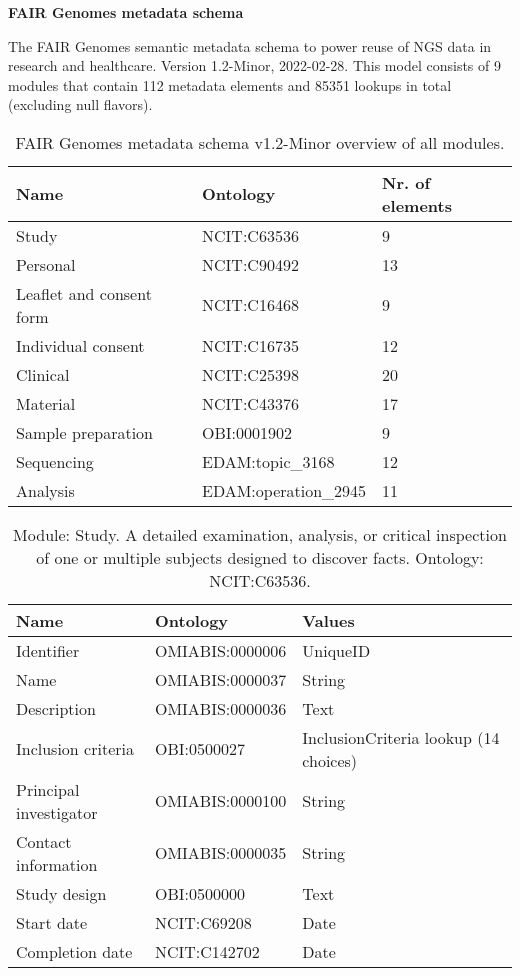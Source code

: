 \documentclass{article}
\begin{document}
\setlength\parindent{0pt}

\textbf{FAIR Genomes metadata schema}
\newline

The FAIR Genomes semantic metadata schema to power reuse of NGS data in research and healthcare. Version 1.2-Minor, 2022-02-28. This model consists of 9 modules that contain 112 metadata elements and 85351 lookups in total (excluding null flavors).

\begin{table}[htb]
\begin{tabular}{lll}
Name & Ontology & Nr. of elements \\
\hline
Study & NCIT:C63536 & 9 \\
Personal & NCIT:C90492 & 13 \\
Leaflet and consent form & NCIT:C16468 & 9 \\
Individual consent & NCIT:C16735 & 12 \\
Clinical & NCIT:C25398 & 20 \\
Material & NCIT:C43376 & 17 \\
Sample preparation & OBI:0001902 & 9 \\
Sequencing & EDAM:topic\_3168 & 12 \\
Analysis & EDAM:operation\_2945 & 11 \\
\hline
\end{tabular}
\caption[Module overview]{\label{table:table1} FAIR Genomes metadata schema v1.2-Minor overview of all modules.}
\end{table}

\begin{table}[htb]
\begin{tabular}{lll}
Name & Ontology & Values \\
\hline
Identifier & OMIABIS:0000006 & UniqueID \\
Name & OMIABIS:0000037 & String \\
Description & OMIABIS:0000036 & Text \\
Inclusion criteria & OBI:0500027 & InclusionCriteria lookup (14 choices) \\
Principal investigator & OMIABIS:0000100 & String \\
Contact information & OMIABIS:0000035 & String \\
Study design & OBI:0500000 & Text \\
Start date & NCIT:C69208 & Date \\
Completion date & NCIT:C142702 & Date \\
\hline
\end{tabular}
\caption[Module: Study]{\label{table:table2} Module: Study. A detailed examination, analysis, or critical inspection of one or multiple subjects designed to discover facts. Ontology: NCIT:C63536. }
\end{table}
\end{document}
